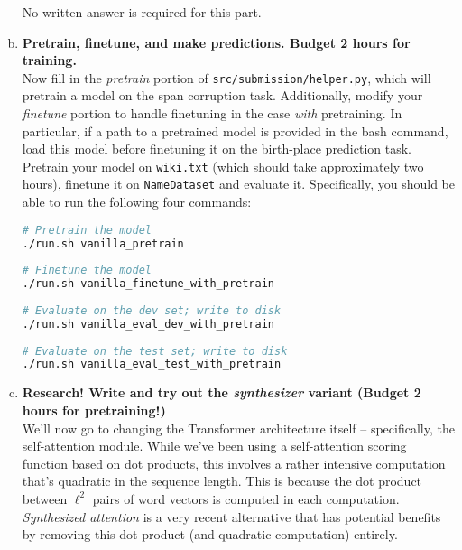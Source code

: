 \begin{enumerate}[(a)]
No written answer is required for this part.

\item {} \textbf{Pretrain, finetune, and make predictions. Budget 2 hours for training.}\\
Now fill in the \textit{pretrain} portion of \texttt{src/submission/helper.py}, which will pretrain a model on the span corruption task. Additionally, modify your \textit{finetune} portion to handle finetuning in the case \textit{with} pretraining. In particular, if a path to a pretrained model is provided in the bash command, load this model before finetuning it on the birth-place prediction task.
Pretrain your model on \texttt{wiki.txt} (which should take approximately two hours), finetune it on \texttt{NameDataset} and evaluate it. Specifically, you should be able to run the following four commands:

\begin{lstlisting}[language=bash]
# Pretrain the model
./run.sh vanilla_pretrain
        
# Finetune the model
./run.sh vanilla_finetune_with_pretrain
        
# Evaluate on the dev set; write to disk
./run.sh vanilla_eval_dev_with_pretrain
        
# Evaluate on the test set; write to disk
./run.sh vanilla_eval_test_with_pretrain
\end{lstlisting}



\pagebreak %

\item {} \textbf{Research! Write and try out the \textit{synthesizer} variant (Budget 2 hours for pretraining!)}\\
We'll now go to changing the Transformer architecture itself -- specifically, the self-attention module.
While we've been using a self-attention scoring function based on dot products, this involves a rather intensive computation that's quadratic in the sequence length. This is because the dot product between $\ell^2$ pairs of word vectors is computed in each computation.
\textit{Synthesized attention} \cite{tay2020synthesizer} is a very recent alternative that has potential benefits by removing this dot product (and quadratic computation) entirely.


\end{enumerate}

